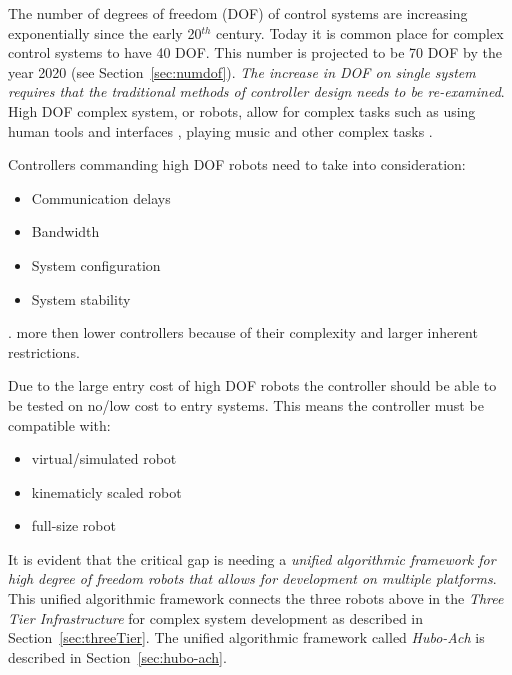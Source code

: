 The number of degrees of freedom (DOF) of control systems are increasing exponentially since the early 20$^{th}$ century.
Today it is common place for complex control systems to have 40 DOF. 
This number is projected to be 70 DOF by the year 2020 (see Section~\ref{sec:numdof}).
\textit{The increase in DOF on single system requires that the traditional methods of controller design needs to be re-examined}.
High DOF complex system, or robots, allow for complex tasks such as using human tools and interfaces \cite{lofaroRAM2013,lofaroTePRA2013HuboAch,lofaroTePRA2013Valve,gtechIK}, playing music \cite{lofaroEURASIP2011, 6094987,lofaroIASTED2011,5686847} and other complex tasks \cite{lofaroHumanoids2012,lofaroGamesRobot,tepraLadder2013}.

Controllers commanding high DOF robots need to take into consideration:
\begin{itemize}
\item Communication delays
\item Bandwidth
\item System configuration
\item System stability
\end{itemize}.
more then lower controllers because of their complexity and larger inherent restrictions.

Due to the large entry cost of high DOF robots the controller should be able to be tested on no/low cost to entry systems.
This means the controller must be compatible with:
\begin{itemize}
\item virtual/simulated robot
\item kinematicly scaled robot
\item full-size robot
\end{itemize}

It is evident that the critical gap is needing a \textit{unified algorithmic framework for high degree of freedom robots that allows for development on multiple platforms}.
This unified algorithmic framework connects the three robots above in the \textit{Three Tier Infrastructure}\cite{threeTier} for complex system development as described in Section~\ref{sec:threeTier}.
The unified algorithmic framework called \textit{Hubo-Ach}\cite{lofaroRAM2013} is described in Section~\ref{sec:hubo-ach}.















